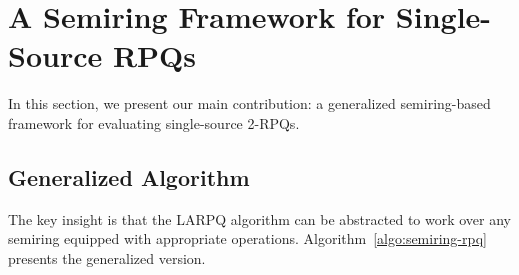 \section{A Semiring Framework for Single-Source RPQs}

\label{sec:semiring-framework}

In this section, we present our main contribution: a generalized semiring-based framework for evaluating single-source 2-RPQs.

\subsection{Generalized Algorithm}

The key insight is that the LARPQ algorithm can be abstracted to work over any semiring equipped with appropriate operations. Algorithm~\ref{algo:semiring-rpq} presents the generalized version.

